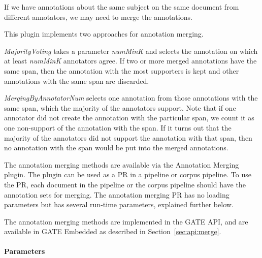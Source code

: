 If we have annotations about the same subject on the same document from
different annotators, we may need to merge the annotations.

This plugin implements two approaches for annotation merging.

{\em MajorityVoting} takes a parameter {\em numMinK} and selects the
annotation on which at least {\em numMinK} annotators agree. If two or more
merged annotations have the same span, then the annotation with the most
supporters is kept and other annotations with the same span are discarded.

{\em MergingByAnnotatorNum} selects one annotation from those annotations with
the same span, which the majority of the annotators support. Note that if one
annotator did not create the annotation with the particular span, we count it
as one non-support of the annotation with the span. If it turns out that the
majority of the annotators did not support the annotation with that span, then
no annotation with the span would be put into the merged annotations.

The annotation merging methods are available via the Annotation Merging
plugin. The plugin can be used as a PR in a pipeline or corpus pipeline. To
use the PR, each document in the pipeline or the corpus pipeline should have
the annotation sets for merging. The annotation merging PR has no loading
parameters but has several run-time parameters, explained further below.

The annotation merging methods are implemented in the GATE API, and are
available in GATE Embedded as described in Section~\ref{sec:api:merge}.

\paragraph{Parameters}

